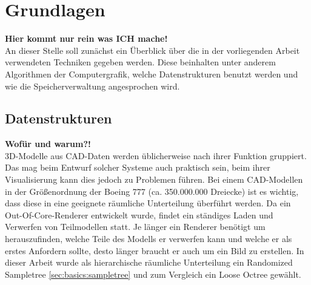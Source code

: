 \chapter{Grundlagen}
\label{chap:basics}
%
\textbf{Hier kommt nur rein was ICH mache!}\\
An dieser Stelle soll zunächst ein Überblick über die in der vorliegenden Arbeit verwendeten Techniken gegeben werden. Diese beinhalten unter anderem Algorithmen der Computergrafik, welche Datenstrukturen benutzt werden und wie die Speicherverwaltung angesprochen wird.

\section{Datenstrukturen}
\label{sec:basics:datenstrukturen}
\textbf{Wofür und warum?!}\\
3D-Modelle aus CAD-Daten werden üblicherweise nach ihrer Funktion gruppiert. Das mag beim Entwurf solcher Systeme auch praktisch sein, beim ihrer Visualisierung kann dies jedoch zu Problemen führen. 
%
Bei einem CAD-Modellen in der Größenordnung der Boeing 777 (ca. 350.000.000 Dreiecke) ist es wichtig, dass diese in eine geeignete räumliche Unterteilung überführt werden. Da ein Out-Of-Core-Renderer entwickelt wurde, findet ein ständiges Laden und Verwerfen von Teilmodellen statt. Je länger ein Renderer benötigt um herauszufinden, welche Teile des Modells er verwerfen kann und welche er als erstes Anfordern sollte, desto länger braucht er auch um ein Bild zu erstellen. In dieser Arbeit wurde als hierarchische räumliche Unterteilung ein Randomized Sampletree \ref{sec:basics:sampletree} und zum Vergleich ein Loose Octree gewählt.

